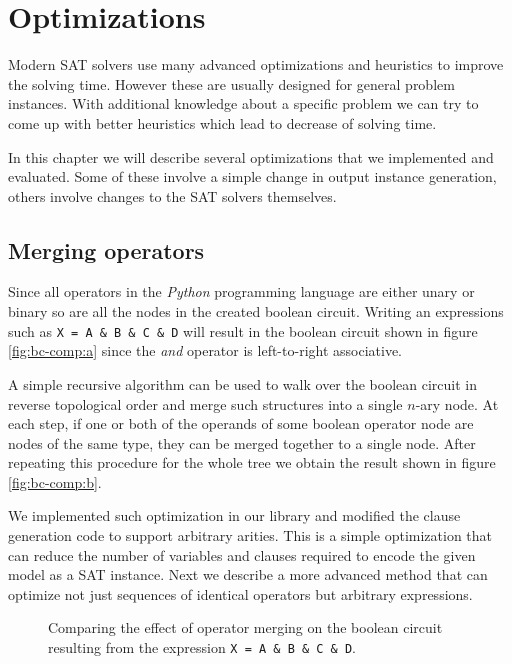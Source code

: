 \chapter{Optimizations}

Modern SAT solvers use many advanced optimizations and heuristics to improve the solving time.
However these are usually designed for general problem instances.
With additional knowledge about a specific problem we can try to come up with better heuristics which lead to decrease of solving time.

In this chapter we will describe several optimizations that we implemented and evaluated.
Some of these involve a simple change in output instance generation, others involve changes to the SAT solvers themselves.

\section{Merging operators}
\label{sec:merging-operators}
Since all operators in the \emph{Python} programming language are either unary or binary so are all the nodes in the created boolean circuit.
Writing an expressions such as \texttt{X = A \& B \& C \& D} will result in the boolean circuit shown in figure \ref{fig:bc-comp:a} since the \emph{and} operator is left-to-right associative.

A simple recursive algorithm can be used to walk over the boolean circuit in reverse topological order and merge such structures into a single $n$-ary node.
At each step, if one or both of the operands of some boolean operator node are nodes of the same type, they can be merged together to a single node.
After repeating this procedure for the whole tree we obtain the result shown in figure \ref{fig:bc-comp:b}.

We implemented such optimization in our library and modified the clause generation code to support arbitrary arities.
This is a simple optimization that can reduce the number of variables and clauses required to encode the given model as a SAT instance.
Next we describe a more advanced method that can optimize not just sequences of identical operators but arbitrary expressions.

\begin{figure}
\centering
{}
\hspace{2cm}
\caption{Comparing the effect of operator merging on the boolean circuit resulting from the expression \texttt{X = A \& B \& C \& D}.}
\end{figure}

